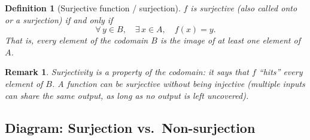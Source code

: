 \documentclass[11pt]{article}
\theoremstyle{defstyle}
\newtheorem{definition}{Definition}[section]
\theoremstyle{thmstyle}
\theoremstyle{notstyle}
\newtheorem*{remark}{Remark}
\theoremstyle{cautionstyle}
\begin{document}
\begin{defbox}
\begin{definition}[Surjective function / surjection]
$f$ is \emph{surjective} (also called \emph{onto} or a \emph{surjection}) if and only if
\[
  \forall\, y \in B,\quad \exists\, x \in A,\quad f(x) = y.
\]
That is, every element of the codomain $B$ is the image of \emph{at least one} element of $A$.
\end{definition}
\end{defbox}

\begin{notebox}
\begin{remark}
Surjectivity is a property of the \emph{codomain}: it says that $f$ ``hits'' every element of $B$.  A function can be surjective without being injective (multiple inputs can share the same output, as long as no output is left uncovered).
\end{remark}
\end{notebox}

\subsection*{Diagram: Surjection vs.\ Non-surjection}
\end{document}
